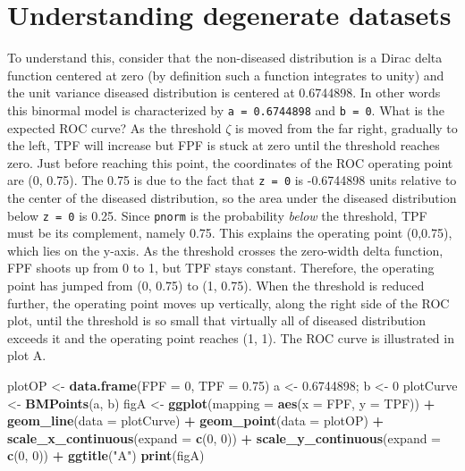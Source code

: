 \documentclass[]{book}
\newenvironment{Shaded}{\begin{snugshade}}{\end{snugshade}}
\newcommand{\DataTypeTok}[1]{\textcolor[rgb]{0.13,0.29,0.53}{#1}}
\newcommand{\DecValTok}[1]{\textcolor[rgb]{0.00,0.00,0.81}{#1}}
\newcommand{\FloatTok}[1]{\textcolor[rgb]{0.00,0.00,0.81}{#1}}
\newcommand{\KeywordTok}[1]{\textcolor[rgb]{0.13,0.29,0.53}{\textbf{#1}}}
\newcommand{\NormalTok}[1]{#1}
\newcommand{\OperatorTok}[1]{\textcolor[rgb]{0.81,0.36,0.00}{\textbf{#1}}}
\newcommand{\StringTok}[1]{\textcolor[rgb]{0.31,0.60,0.02}{#1}}
\begin{document}
\hypertarget{understanding-degenerate-datasets}{%
\section{Understanding degenerate datasets}\label{understanding-degenerate-datasets}}

To understand this, consider that the non-diseased distribution is a Dirac delta function centered at zero (by definition such a function integrates to unity) and the unit variance diseased distribution is centered at 0.6744898. In other words this binormal model is characterized by \texttt{a\ =\ 0.6744898} and \texttt{b\ =\ 0}. What is the expected ROC curve? As the threshold \(\zeta\) is moved from the far right, gradually to the left, TPF will increase but FPF is stuck at zero until the threshold reaches zero. Just before reaching this point, the coordinates of the ROC operating point are (0, 0.75). The 0.75 is due to the fact that \texttt{z\ =\ 0} is -0.6744898 units relative to the center of the diseased distribution, so the area under the diseased distribution below \texttt{z\ =\ 0} is 0.25. Since \texttt{pnorm} is the probability \emph{below} the threshold, TPF must be its complement, namely 0.75. This explains the operating point (0,0.75), which lies on the y-axis. As the threshold crosses the zero-width delta function, FPF shoots up from 0 to 1, but TPF stays constant. Therefore, the operating point has jumped from (0, 0.75) to (1, 0.75). When the threshold is reduced further, the operating point moves up vertically, along the right side of the ROC plot, until the threshold is so small that virtually all of diseased distribution exceeds it and the operating point reaches (1, 1). The ROC curve is illustrated in plot A.

\begin{Shaded}
\begin{Highlighting}[]
\NormalTok{plotOP <-}\StringTok{ }\KeywordTok{data.frame}\NormalTok{(}\DataTypeTok{FPF =} \DecValTok{0}\NormalTok{, }\DataTypeTok{TPF =} \FloatTok{0.75}\NormalTok{)}
\NormalTok{a <-}\StringTok{ }\FloatTok{0.6744898}\NormalTok{; b <-}\StringTok{ }\DecValTok{0}
\NormalTok{plotCurve <-}\StringTok{ }\KeywordTok{BMPoints}\NormalTok{(a, b)}
\NormalTok{figA <-}\StringTok{ }\KeywordTok{ggplot}\NormalTok{(}\DataTypeTok{mapping =} \KeywordTok{aes}\NormalTok{(}\DataTypeTok{x =}\NormalTok{ FPF, }\DataTypeTok{y =}\NormalTok{ TPF)) }\OperatorTok{+}\StringTok{ }
\StringTok{  }\KeywordTok{geom_line}\NormalTok{(}\DataTypeTok{data =}\NormalTok{ plotCurve) }\OperatorTok{+}\StringTok{ }
\StringTok{  }\KeywordTok{geom_point}\NormalTok{(}\DataTypeTok{data =}\NormalTok{ plotOP)  }\OperatorTok{+}\StringTok{ }
\StringTok{  }\KeywordTok{scale_x_continuous}\NormalTok{(}\DataTypeTok{expand =} \KeywordTok{c}\NormalTok{(}\DecValTok{0}\NormalTok{, }\DecValTok{0}\NormalTok{)) }\OperatorTok{+}\StringTok{ }
\StringTok{  }\KeywordTok{scale_y_continuous}\NormalTok{(}\DataTypeTok{expand =} \KeywordTok{c}\NormalTok{(}\DecValTok{0}\NormalTok{, }\DecValTok{0}\NormalTok{)) }\OperatorTok{+}
\StringTok{  }\KeywordTok{ggtitle}\NormalTok{(}\StringTok{"A"}\NormalTok{)}
\KeywordTok{print}\NormalTok{(figA)}
\end{Highlighting}
\end{Shaded}
\end{document}
